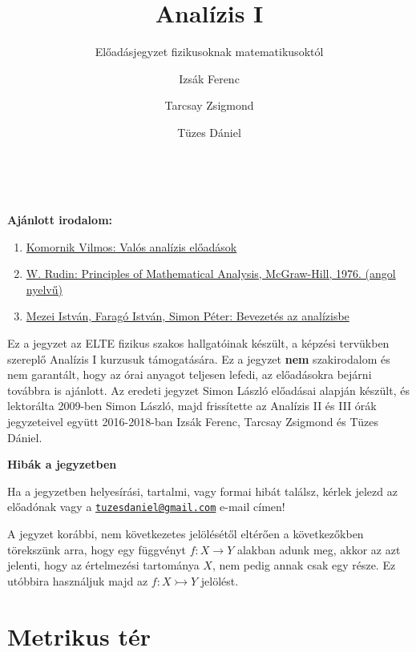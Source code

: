 \documentclass[12pt,a4paper]{scrartcl}
\title{Analízis I}
\subtitle{Előadásjegyzet fizikusoknak matematikusoktól}
\author{Izsák Ferenc \and Tarcsay Zsigmond \and Tüzes Dániel}
\institute{ELTE}
\date{}
\providecommand{\tightlist}{%
  \setlength{\itemsep}{0pt}\setlength{\parskip}{0pt}}
\begin{document}
\maketitle


\setcounter{tocdepth}{6}
\tableofcontents

~

\textbf{Ajánlott irodalom:}

\begin{enumerate}
\def\labelenumi{\arabic{enumi}.}
\tightlist
\item
  \href{http://www.typotex.hu/index.php?page=konyvek\&book_id=240}{Komornik
  Vilmos: Valós analízis előadások}
\item
  \href{https://notendur.hi.is/vae11/\%C3\%9Eekking/principles_of_mathematical_analysis_walter_rudin.pdf}{W.
  Rudin: Principles of Mathematical Analysis, McGraw-Hill, 1976. (angol
  nyelvű)}
\item
  \href{http://www.cs.elte.hu/\%7Esimonp/jegyzet1.pdf}{Mezei István,
  Faragó István, Simon Péter: Bevezetés az analízisbe}
\end{enumerate}

Ez a jegyzet az ELTE fizikus szakos hallgatóinak készült, a képzési
tervükben szereplő Analízis I kurzusuk támogatására. Ez a jegyzet
\textbf{nem} szakirodalom és nem garantált, hogy az órai anyagot
teljesen lefedi, az előadásokra bejárni továbbra is ajánlott. Az eredeti
jegyzet Simon László előadásai alapján készült, és lektorálta 2009-ben
Simon László, majd frissítette az Analízis II és III órák jegyzeteivel
együtt 2016-2018-ban Izsák Ferenc, Tarcsay Zsigmond és Tüzes Dániel.

\textbf{Hibák a jegyzetben}

Ha a jegyzetben helyesírási, tartalmi, vagy formai hibát találsz, kérlek
jelezd az előadónak vagy a
\href{mailto:tuzesdaniel@gmail.com}{\nolinkurl{tuzesdaniel@gmail.com}}
e-mail címen!

A jegyzet korábbi, nem következetes jelölésétől eltérően a következőkben
törekszünk arra, hogy egy függvényt \(\left. f:X\rightarrow Y \right.\)
alakban adunk meg, akkor az azt jelenti, hogy az értelmezési tartománya
\(X\), nem pedig annak csak egy része. Ez utóbbira használjuk majd az
\(\left. f:X\rightarrowtail Y \right.\) jelölést.

\hypertarget{metrikus-ter}{%
\section{Metrikus tér}\label{metrikus-ter}}
\end{document}
